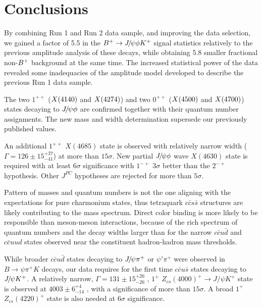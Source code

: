 
\section{Conclusions}

By combining Run 1 and Run 2 data sample, 
and improving the data selection, we gained a factor of 5.5 in the ${{{B}^+}}\rightarrow{\ensuremath{{J\mskip -3mu/\mskip -2mu\psi}}}\phi{\ensuremath{{K}^+}}$ signal statistics relatively to the previous amplitude analysis of these decays, 
while obtaining 5.8 smaller fractional non-${{{B}^+}}$ background at the same time.
The increased statistical power of the data revealed some inadequacies of the amplitude model developed to describe the previous Run 1 data sample. 

The two $1^{++}$ ($X(4140)$ and $X(4274)$) 
and two $0^{++}$ ($X(4500)$ and $X(4700)$) 
states decaying to ${{J\mskip -3mu/\mskip -2mu\psi}}\phi$ are confirmed together with their quantum number assignments.
The new mass and width determination supersede our previously published values.

An additional $1^{++}$ $X(4685)$ state is observed with relatively narrow width ($\Gamma=126\pm15_{-41}^{+37}$\mev) at more than $15\sigma$.
New partial ${{J\mskip -3mu/\mskip -2mu\psi}}\phi$ wave $X(4630)$ state is required with at least $6\sigma$ significance with $1^{-+}$ $3\sigma$ better than the $2^{-+}$ hypothesis. 
Other $J^{PC}$ hypotheses are rejected for more than $5\sigma$.

Pattern of masses and quantum numbers is not the one aligning with the expectations for pure charmonium states, 
thus tetraquark $c\bar{c}s\bar{s}$ structures are likely contributing to the mass spectrum.
Direct color binding is more likely to be responsible than  meson-meson interactions, 
because of the rich spectrum of quantum numbers and the decay widths larger than 
for the narrow $c\bar{c}u\bar{d}$ and $c\bar{c}uud$ states observed near the constituent hadron-hadron mass thresholds. 

While broader $c\bar{c}u\bar{d}$ states decaying to ${{J\mskip -3mu/\mskip -2mu\psi}}\pi^+$ or $\psi'\pi^+$ were observed in $B\to\psi\pi^+K$ decays, 
our data requires for the first time $c\bar{c}u\bar{s}$ states decaying to ${{J\mskip -3mu/\mskip -2mu\psi}} K^+$. 
A relatively narrow, 
$\Gamma=131\pm15_{-26}^{+26}$ \mev, 
$1^+$ $Z_{cs}(4000)^+\to J/\psi K^+$ state is observed at $4003\pm6_{-14}^{+4}$ \mev, 
with a significance of more than $15\sigma$. 
A broad $1^+$ $Z_{cs}(4220)^+$ state is also needed at $6\sigma$ significance.







